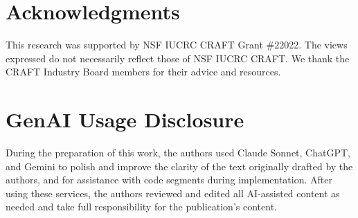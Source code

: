 \documentclass[sigconf]{acmart}
\begin{document}

\section*{Acknowledgments}
This research was supported by NSF IUCRC CRAFT Grant \#22022. The views expressed do not necessarily reflect those of NSF IUCRC CRAFT. We thank the CRAFT Industry Board members for their advice and resources.

\section*{GenAI Usage Disclosure}
During the preparation of this work, the authors used Claude Sonnet, ChatGPT, and Gemini to polish and improve the clarity of the text originally drafted by the authors, and for assistance with code segments during implementation. After using these services, the authors reviewed and edited all AI-assisted content as needed and take full responsibility for the publication's content.


\balance

\end{document}
